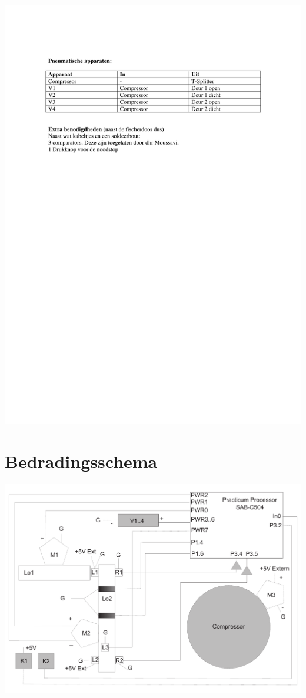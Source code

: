 \begin{center}
    \includegraphics[scale=.7]{priklijst2}
    \end{center}


\section{Bedradingsschema}


    \begin{center}
    \includegraphics[scale=.5]{bedrading}
    \end{center}

